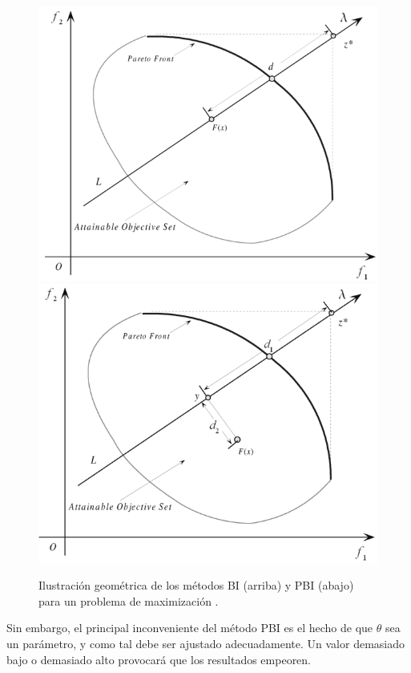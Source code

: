 \begin{enumerate}
\begin{figure}[H]
	\centering
	\includegraphics[width=1.0\textwidth]{Images/bi}
	\includegraphics[width=1.0\textwidth]{Images/pbi}
	\caption[Ilustración geométrica de los métodos BI y PBI para un problema de maximización.]{Ilustración geométrica de los métodos BI (arriba) y PBI (abajo) para un problema de maximización \cite{zhang2007moea}.}
	\label{fig:boundaryint}
\end{figure}
	
	Sin embargo, el principal inconveniente del método PBI es el hecho de que $\theta$ sea un parámetro, y como tal debe ser ajustado adecuadamente. Un valor demasiado bajo o demasiado alto provocará que los resultados empeoren.

\end{enumerate}
\newpage



